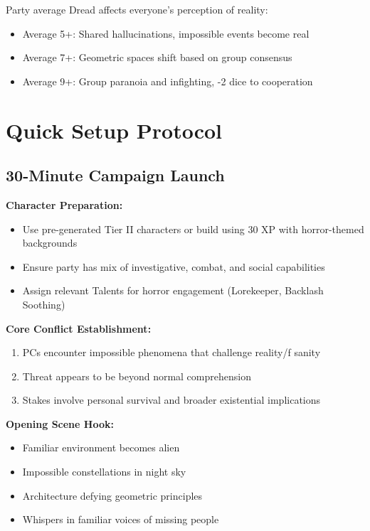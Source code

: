\documentclass[11pt]{article}
\begin{document}
Party average Dread affects everyone's perception of reality:
\begin{itemize}
\item Average 5+: Shared hallucinations, impossible events become real
\item Average 7+: Geometric spaces shift based on group consensus
\item Average 9+: Group paranoia and infighting, -2 dice to cooperation
\end{itemize}

\section{Quick Setup Protocol}

\subsection{30-Minute Campaign Launch}

\textbf{Character Preparation:}
\begin{itemize}
\item Use pre-generated Tier II characters or build using 30 XP with horror-themed backgrounds
\item Ensure party has mix of investigative, combat, and social capabilities
\item Assign relevant Talents for horror engagement (Lorekeeper, Backlash Soothing)
\end{itemize}

\textbf{Core Conflict Establishment:}
\begin{enumerate}
\item PCs encounter impossible phenomena that challenge reality/f sanity
\item Threat appears to be beyond normal comprehension
\item Stakes involve personal survival and broader existential implications
\end{enumerate}

\textbf{Opening Scene Hook:}
\begin{itemize}
\item Familiar environment becomes alien
\item Impossible constellations in night sky
\item Architecture defying geometric principles
\item Whispers in familiar voices of missing people
\end{itemize}
\end{document}
